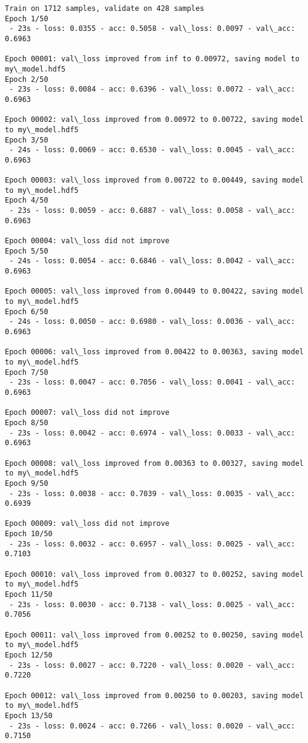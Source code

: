\documentclass[11pt]{article}
\begin{document}
    \begin{Verbatim}[commandchars=\\\{\}]
Train on 1712 samples, validate on 428 samples
Epoch 1/50
 - 23s - loss: 0.0355 - acc: 0.5058 - val\_loss: 0.0097 - val\_acc: 0.6963

Epoch 00001: val\_loss improved from inf to 0.00972, saving model to my\_model.hdf5
Epoch 2/50
 - 23s - loss: 0.0084 - acc: 0.6396 - val\_loss: 0.0072 - val\_acc: 0.6963

Epoch 00002: val\_loss improved from 0.00972 to 0.00722, saving model to my\_model.hdf5
Epoch 3/50
 - 24s - loss: 0.0069 - acc: 0.6530 - val\_loss: 0.0045 - val\_acc: 0.6963

Epoch 00003: val\_loss improved from 0.00722 to 0.00449, saving model to my\_model.hdf5
Epoch 4/50
 - 23s - loss: 0.0059 - acc: 0.6887 - val\_loss: 0.0058 - val\_acc: 0.6963

Epoch 00004: val\_loss did not improve
Epoch 5/50
 - 24s - loss: 0.0054 - acc: 0.6846 - val\_loss: 0.0042 - val\_acc: 0.6963

Epoch 00005: val\_loss improved from 0.00449 to 0.00422, saving model to my\_model.hdf5
Epoch 6/50
 - 24s - loss: 0.0050 - acc: 0.6980 - val\_loss: 0.0036 - val\_acc: 0.6963

Epoch 00006: val\_loss improved from 0.00422 to 0.00363, saving model to my\_model.hdf5
Epoch 7/50
 - 23s - loss: 0.0047 - acc: 0.7056 - val\_loss: 0.0041 - val\_acc: 0.6963

Epoch 00007: val\_loss did not improve
Epoch 8/50
 - 23s - loss: 0.0042 - acc: 0.6974 - val\_loss: 0.0033 - val\_acc: 0.6963

Epoch 00008: val\_loss improved from 0.00363 to 0.00327, saving model to my\_model.hdf5
Epoch 9/50
 - 23s - loss: 0.0038 - acc: 0.7039 - val\_loss: 0.0035 - val\_acc: 0.6939

Epoch 00009: val\_loss did not improve
Epoch 10/50
 - 23s - loss: 0.0032 - acc: 0.6957 - val\_loss: 0.0025 - val\_acc: 0.7103

Epoch 00010: val\_loss improved from 0.00327 to 0.00252, saving model to my\_model.hdf5
Epoch 11/50
 - 23s - loss: 0.0030 - acc: 0.7138 - val\_loss: 0.0025 - val\_acc: 0.7056

Epoch 00011: val\_loss improved from 0.00252 to 0.00250, saving model to my\_model.hdf5
Epoch 12/50
 - 23s - loss: 0.0027 - acc: 0.7220 - val\_loss: 0.0020 - val\_acc: 0.7220

Epoch 00012: val\_loss improved from 0.00250 to 0.00203, saving model to my\_model.hdf5
Epoch 13/50
 - 23s - loss: 0.0024 - acc: 0.7266 - val\_loss: 0.0020 - val\_acc: 0.7150


\end{Verbatim}
\end{document}
